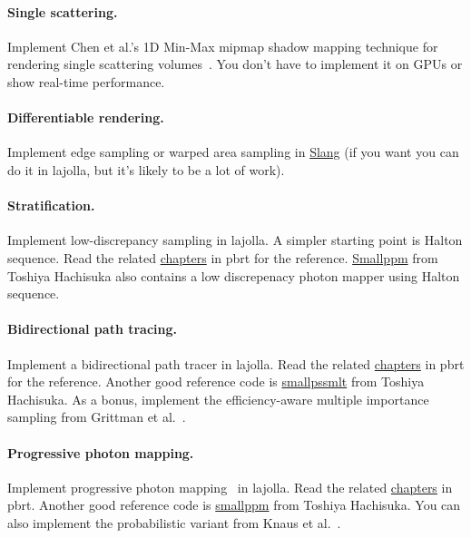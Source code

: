 \paragraph{Single scattering.}
Implement Chen et al.'s 1D Min-Max mipmap shadow mapping technique for rendering single scattering volumes~\cite{Chen:2011:RVS}.
You don't have to implement it on GPUs or show real-time performance.

\paragraph{Differentiable rendering.}
Implement edge sampling or warped area sampling in \href{https://developer.nvidia.com/blog/differentiable-slang-example-applications/}{Slang} (if you want you can do it in lajolla, but it's likely to be a lot of work). 

\paragraph{Stratification.}
Implement low-discrepancy sampling in lajolla.
A simpler starting point is Halton sequence.
Read the related \href{https://www.pbr-book.org/3ed-2018/Sampling_and_Reconstruction/The_Halton_Sampler}{chapters} in pbrt for the reference.
\href{https://cs.uwaterloo.ca/~thachisu/smallppm_exp.cpp}{Smallppm} from Toshiya Hachisuka also contains a low discrepenacy photon mapper using Halton sequence.

\paragraph{Bidirectional path tracing.}
Implement a bidirectional path tracer in lajolla.
Read the related \href{https://www.pbr-book.org/3ed-2018/Light_Transport_III_Bidirectional_Methods/Bidirectional_Path_Tracing}{chapters} in pbrt for the reference.
Another good reference code is \href{https://cs.uwaterloo.ca/~thachisu/smallpssmlt.cpp}{smallpssmlt} from Toshiya Hachisuka.
As a bonus, implement the efficiency-aware multiple importance sampling from Grittman et al.~\cite{Grittmann:2022:EMI}.

\paragraph{Progressive photon mapping.}
Implement progressive photon mapping~\cite{Hachisuka:2008:PPM} in lajolla.
Read the related \href{https://www.pbr-book.org/3ed-2018/Light_Transport_III_Bidirectional_Methods/Stochastic_Progressive_Photon_Mapping}{chapters} in pbrt.
Another good reference code is \href{https://cs.uwaterloo.ca/~thachisu/smallppm_exp.cpp}{smallppm} from Toshiya Hachisuka.
You can also implement the probabilistic variant from Knaus et al.~\cite{Knaus:2011:PPM}.

